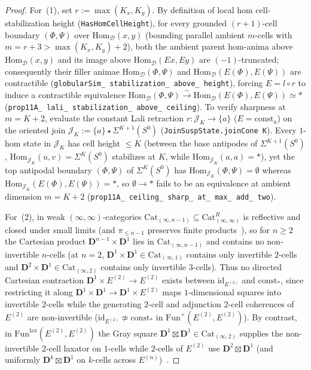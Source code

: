 \begin{proof}
For~(1), set $r := \max(K_x, K_y)$. By definition of local hom cell-stabilization height (\texttt{HasHomCellHeight}), for every grounded $(r+1)$-cell boundary $(\Phi, \Psi)$ over $\mathrm{Hom}_{\mathcal{D}}(x, y)$ (bounding parallel ambient $m$-cells with $m = r + 3 > \max(K_x, K_y) + 2$), both the ambient parent hom-anima above $\mathrm{Hom}_{\mathcal{D}}(x, y)$ and its image above $\mathrm{Hom}_{\mathcal{D}}(E x, E y)$ are $(-1)$-truncated; consequently their filler animae $\mathrm{Hom}_{\mathcal{D}}(\Phi, \Psi)$ and $\mathrm{Hom}_{\mathcal{D}}(E(\Phi), E(\Psi))$ are contractible (\texttt{globularSim\_ stabilization\_ above\_ height}), forcing $E = l \circ r$ to induce a contractible equivalence $\mathrm{Hom}_{\mathcal{D}}(\Phi, \Psi) \xrightarrow{\sim} \mathrm{Hom}_{\mathcal{D}}(E(\Phi), E(\Psi)) \simeq *$ (\texttt{prop11A\_ lali\_ stabilization\_ above\_ ceiling}). To verify sharpness at $m = K + 2$, evaluate the constant Lali retraction $r : \mathcal{J}_K \to \{a\}$ ($E = \mathrm{const}_a$) on the oriented join $\mathcal{J}_K := \{a\} \star \Sigma^{K+1}(S^0)$ (\texttt{JoinSuspState.joinCone K}). Every $1$-hom state in $\mathcal{J}_K$ has cell height $\le K$ (between the base antipodes of $\Sigma^{K+1}(S^0)$, $\mathrm{Hom}_{\mathcal{J}_K}(u, v) = \Sigma^K(S^0)$ stabilizes at $K$, while $\mathrm{Hom}_{\mathcal{J}_K}(a, a) = *$), yet the top antipodal boundary $(\Phi, \Psi)$ of $\Sigma^K(S^0)$ has $\mathrm{Hom}_{\mathcal{J}_K}(\Phi, \Psi) = \emptyset$ whereas $\mathrm{Hom}_{\mathcal{J}_K}(E(\Phi), E(\Psi)) = *$, so $\emptyset \to *$ fails to be an equivalence at ambient dimension $m = K + 2$ (\texttt{prop11A\_ ceiling\_ sharp\_ at\_ max\_ add\_ two}).

For~(2), in weak $(\infty, \infty)$-categories $\mathrm{Cat}_{(\infty, n-1)} \subseteq \mathrm{Cat}^R_{(\infty, \infty)}$ is reflective and closed under small limits (and $\pi_{\le n-1}$ preserves finite products~\cite[Lemma~2.13]{ORW26}), so for $n \ge 2$ the Cartesian product $\mathbf{D}^{n-1} \times \mathbf{D}^1$ lies in $\mathrm{Cat}_{(\infty, n-1)}$ and contains no non-invertible $n$-cells (at $n = 2$, $\mathbf{D}^1 \times \mathbf{D}^1 \in \mathrm{Cat}_{(\infty, 1)}$ contains only invertible $2$-cells and $\mathbf{D}^2 \times \mathbf{D}^1 \in \mathrm{Cat}_{(\infty, 2)}$ contains only invertible $3$-cells). Thus no directed Cartesian contraction $\mathbf{D}^1 \times E^{(2)} \to E^{(2)}$ exists between $\mathrm{id}_{E^{(2)}}$ and $\mathrm{const}_*$, since restricting it along $\mathbf{D}^1 \times \mathbf{D}^1 \to \mathbf{D}^1 \times E^{(2)}$ maps $1$-dimensional squares into invertible $2$-cells while the generating $2$-cell and adjunction $2$-cell coherences of $E^{(2)}$ are non-invertible ($\mathrm{id}_{E^{(2)}} \not\simeq \mathrm{const}_*$ in $\mathrm{Fun}^\times(E^{(2)}, E^{(2)})$). By contrast, in $\mathrm{Fun}^{\mathrm{lax}}(E^{(2)}, E^{(2)})$ the Gray square $\mathbf{D}^1 \boxtimes \mathbf{D}^1 \in \mathrm{Cat}_{(\infty, 2)}$ supplies the non-invertible $2$-cell laxator on $1$-cells while $2$-cells of $E^{(2)}$ use $\mathbf{D}^2 \boxtimes \mathbf{D}^1$ (and uniformly $\mathbf{D}^k \boxtimes \mathbf{D}^1$ on $k$-cells across $E^{(n)}$)~\cite{GepnerHeine26,Heine26,Geiss26}.
\end{proof}

